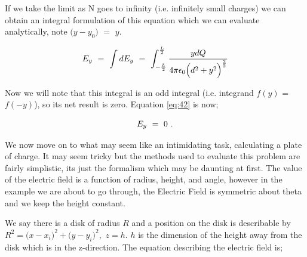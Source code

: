 \documentclass{article}
\newcounter{subsubsubsection}[subsubsection]
\begin{document}
If we take the limit as N goes to infinity (i.e. infinitely small charges) we can obtain an integral formulation of this equation which we can evaluate analytically, note \begin{math} \big(y - y_0\big) \end{math} \begin{math} = \end{math} \begin{math} y \end{math}. 

\begin{equation} \label{eq:42}
E_y \hspace{0.125cm} = \hspace{0.125cm} \int dE_{y} \hspace{0.125cm} = \hspace{0.125cm} \int_{-\frac{L}{2}}^{\frac{L}{2}} \frac{y dQ }{4\pi \epsilon_{0} \Big( d^2 + y^2 \Big)^{\frac{3}{2}}}
\end{equation}

Now we will note that this integral is an odd integral (i.e. integrand \begin{math} f(y) \end{math} = \begin{math} f(-y) \end{math}), so its net result is zero. Equation \ref{eq:42} is now;

\begin{equation} \label{eq:43}
E_y \hspace{0.125cm} = \hspace{0.125cm} 0 \hspace{0.125cm} . 
\end{equation}





We now move on to what may seem like an intimidating task, calculating a plate of charge. It may seem tricky but the methods used to evaluate this problem are fairly simplistic, its just the formalism which may be daunting at first. The value of the electric field is a function of radius, height, and angle, however in the example we are about to go through, the Electric Field is symmetric about theta and we keep the height constant. 

We say there is a disk of radius \begin{math} R \end{math} and a position on the disk is describable by \begin{math} R^{2} = \big(x - x_{i}\big)^{2} + \big(y - y_{i}\big)^{2} , \end{math} \begin{math} z = h \end{math}. \begin{math} h \end{math} is the dimension of the height away from the disk which is in the z-direction. The equation describing the electric field is; 
\end{document}
